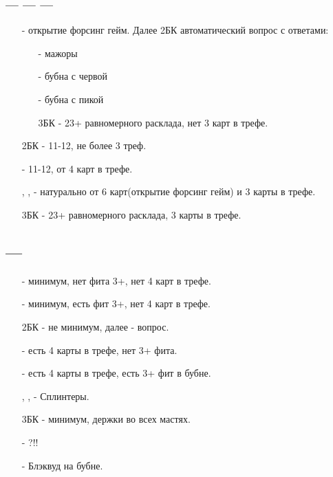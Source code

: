 \documentclass{article}
\begin{document}
\subsubsection{ ---  ---  --- }
\begin{enumerate}
    \item[\sp{2}] - открытие форсинг гейм. Далее 2БК автоматический вопрос с ответами:
    \begin{enumerate}
        \item[\cl{3}] - мажоры
        \item[\di{3}] - бубна с червой
        \item[\he{3}] - бубна с пикой
        \item[3БК] - 23+ равномерного расклада, нет 3 карт в трефе.
    \end{enumerate}
    \item[2БК] - 11-12, не более 3 треф.
    \item[\cl{3}] - 11-12, от 4 карт в трефе.
    \item[\di{3}, \he{3}, \sp{3}] - натурально от 6 карт(открытие форсинг гейм) и 3 карты в трефе. 
    \item[3БК] - 23+ равномерного расклада, 3 карты в трефе.
\end{enumerate}
\subsection{ --- }
\begin{enumerate}
    \item[\he{2}] - минимум, нет фита 3+, нет 4 карт в трефе.
    \item[\sp{2}] - минимум, есть фит 3+, нет 4 карт в трефе.
    \item[2БК] - не минимум, далее  - вопрос.
    \item[\cl{3}] - есть 4 карты в трефе, нет 3+ фита.
    \item[\di{3}] - есть 4 карты в трефе, есть 3+ фит в бубне.
    \item[\he{3}, \sp{3}, \cl{4}] - Сплинтеры.
    \item[3БК] - минимум, держки во всех мастях.
    \item[\di{4}] - ?!!
    \item[\he{4}] - Блэквуд на бубне.
\end{enumerate}
\end{document}
